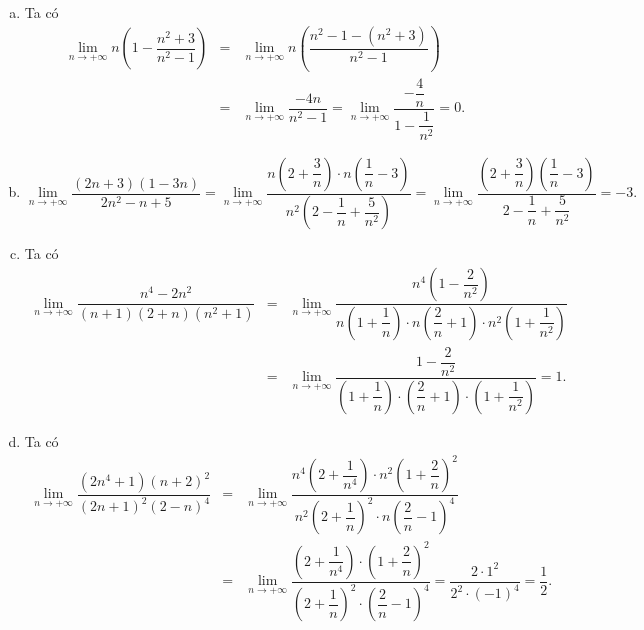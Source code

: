 \begin{vd}
{\begin{enumerate}[a)]
			\item Ta có
			\begin{eqnarray*}
				\lim\limits_{n \to +\infty}n\left(1-\dfrac{n^2+3}{n^2-1}\right)
				&=&\lim\limits_{n \to +\infty}n\left(\dfrac{n^2-1-(n^2+3)}{n^2-1}\right)\\
				&=& \lim\limits_{n \to +\infty}\dfrac{-4n}{n^2-1}= \lim\limits_{n \to +\infty}\dfrac{-\dfrac{4}{n}}{1-\dfrac{1}{n^2}}=0.
			\end{eqnarray*}
			
			\item $\lim\limits_{n \to +\infty}\dfrac{(2n+3)\left(1-3n\right)}{2n^2-n+5}=\lim\limits_{n \to +\infty}\dfrac{n\left(2+\dfrac{3}{n} \right) \cdot n\left( \dfrac{1}{n}-3\right) }{n^2\left(2-\dfrac{1}{n}+\dfrac{5}{n^2} \right)}=\lim\limits_{n \to +\infty}\dfrac{\left(2+\dfrac{3}{n} \right)\left( \dfrac{1}{n}-3\right) }{2-\dfrac{1}{n}+\dfrac{5}{n^2}}=-3.$
			\item Ta có
			\begin{eqnarray*}
				\lim\limits_{n \to +\infty}\dfrac{n^4-2n^2}{(n+1)(2+n)(n^2+1)}
				&=&\lim\limits_{n \to +\infty}\dfrac{n^4\left(1-\dfrac{2}{n^2} \right) }{n\left(1+\dfrac{1}{n}\right) \cdot n\left(\dfrac{2}{n}+1\right) \cdot n^2\left(1+\dfrac{1}{n^2}\right)}\\
				&=& \lim\limits_{n \to +\infty}\dfrac{1-\dfrac{2}{n^2}}{\left(1+\dfrac{1}{n}\right) \cdot \left(\dfrac{2}{n}+1\right) \cdot \left(1+\dfrac{1}{n^2}\right)}=1.
			\end{eqnarray*}
			\item Ta có
			\begin{eqnarray*}
				\lim\limits_{n \to +\infty}\dfrac{\left(2n^4+1\right){(n+2)}^2}{{(2n+1)}^2{\left(2-n\right)}^4}
				&=&\lim\limits_{n \to +\infty}\dfrac{n^4\left(2+\dfrac{1}{n^4} \right) \cdot n^2\left(1+\dfrac{2}{n} \right)^2 }{n^2\left(2+\dfrac{1}{n} \right)^2 \cdot n\left(\dfrac{2}{n}-1 \right)^4}\\
				&=& \lim\limits_{n \to +\infty}\dfrac{\left(2+\dfrac{1}{n^4} \right) \cdot \left(1+\dfrac{2}{n} \right)^2 }{\left(2+\dfrac{1}{n} \right)^2 \cdot \left(\dfrac{2}{n}-1 \right)^4}=\dfrac{2 \cdot 1^2}{2^2 \cdot (-1)^4}=\dfrac{1}{2}.
			\end{eqnarray*}
	\end{enumerate}}
\end{vd}

